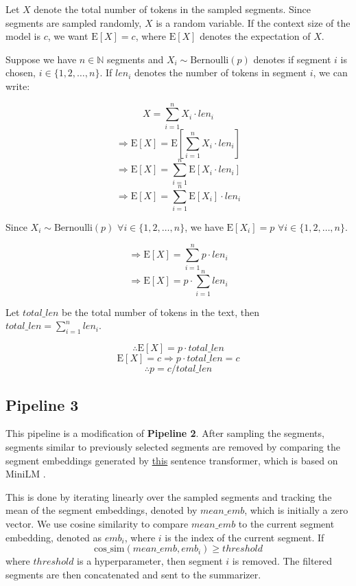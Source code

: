Let $X$ denote the total number of tokens in the sampled segments.
Since segments are sampled randomly, $X$ is a random variable.
If the context size of the model is $c$, we want $\mathrm{E}[X] = c$, where $\mathrm{E}[X]$
denotes the expectation of $X$.

Suppose we have $n \in \mathbb{N}$ segments and $X_i \sim \mathrm{Bernoulli}(p)$ denotes
if segment $i$ is chosen, $i \in \{1, 2, \dots, n\}$.
If $len_i$ denotes the number of tokens in segment $i$, we can write:

\[ X = \sum_{i = 1}^{n} X_i \cdot len_i \]
\[ \Rightarrow \mathrm{E}[X] = \mathrm{E}[\sum_{i = 1}^{n} X_i \cdot len_i] \]
\[ \Rightarrow \mathrm{E}[X] = \sum_{i = 1}^{n} \mathrm{E}[X_i \cdot len_i] \]
\[ \Rightarrow \mathrm{E}[X] = \sum_{i = 1}^{n} \mathrm{E}[X_i] \cdot len_i \]

Since $X_i \sim \mathrm{Bernoulli}(p)$ $\forall i \in \{1, 2, \dots, n\}$, we
have $\mathrm{E}[X_i] = p$ $\forall i \in \{1, 2, \dots, n\}$.

\[ \Rightarrow \mathrm{E}[X] = \sum_{i = 1}^{n} p \cdot len_i \]
\[ \Rightarrow \mathrm{E}[X] = p \cdot \sum_{i = 1}^{n} len_i \]

Let $total\_len$ be the total number of tokens in the text, then
$total\_len = \sum_{i = 1}^{n} len_i$.

\[ \therefore \mathrm{E}[X] = p \cdot total\_len \]
\[ \mathrm{E}[X] = c \Rightarrow p \cdot total\_len = c \]
\[ \therefore p = c / total\_len \]


\subsection*{Pipeline 3}

This pipeline is a modification of \textbf{Pipeline 2}.
After sampling the segments, segments similar to previously selected segments are
removed by comparing the segment embeddings generated by
\href{https://huggingface.co/sentence-transformers/all-MiniLM-L6-v2}{this} sentence
transformer, which is based on MiniLM \cite{wang2020minilm}.

This is done by iterating linearly over the sampled segments and tracking the mean
of the segment embeddings, denoted by $mean\_emb$, which is initially a zero vector.
We use cosine similarity to compare $mean\_emb$ to the current segment embedding,
denoted as $emb_i$, where $i$ is the index of the current segment.
If \[ \mathrm{cos\_sim}(mean\_emb, emb_i) \ge threshold \]
where $threshold$ is a hyperparameter, then segment $i$ is removed.
The filtered segments are then concatenated and sent to the summarizer.


